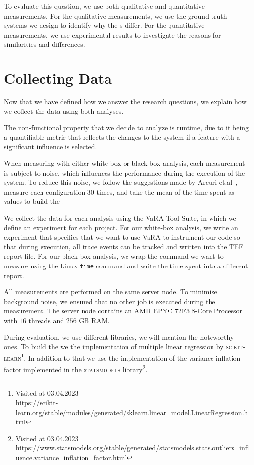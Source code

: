 To evaluate this question, we use both qualitative and quantitative measurements. 
For the qualitative measurements, we use the ground truth systems we design to identify why the {\perfInfluenceModel}s differ. 
For the quantitative measurements, we use experimental results to investigate the reasons for similarities and differences.

\section{Collecting Data}\label{ch:collect-data}
Now that we have defined how we answer the research questions, we explain how we collect the data using both analyses.

The non-functional property that we decide to analyze is runtime, due to it being a quantifiable metric
that reflects the changes to the system if a feature with a significant influence is selected.

When measuring with either white-box or black-box analysis, 
each measurement is subject to noise, which influences the performance during the execution of the system. 
To reduce this noise, we follow the suggestions made by Arcuri et.al~\cite{SampleSize}, 
measure each configuration 30 times, and take the mean of the time spent as values to build the {\perfInfluenceModel}.

We collect the data for each analysis using the VaRA Tool Suite, in which we define an experiment for each project. 
For our white-box analysis, we write an experiment that specifies that we want to use VaRA to instrument our code so that during execution, 
all trace events can be tracked and written into the TEF report file. For our black-box analysis, 
we wrap the command we want to measure using the Linux \texttt{time} command and write the time spent into a different report. 

All measurements are performed on the same server node. To minimize background noise, we ensured that no other job is executed during the measurement. 
The server node contains an AMD EPYC $72$F$3$  $8$-Core Processor with $16$ threads and $256$ GB RAM.

During evaluation, we use different libraries, we will mention the noteworthy ones.
To build the {\perfInfluenceModel} we the implementation of multiple linear regression by \textsc{scikit-learn}\footnote{Visited at 03.04.2023\\ \url{https://scikit-learn.org/stable/modules/generated/sklearn.linear_model.LinearRegression.html}}.
In addition to that we use the implementation of the variance inflation factor implemented in the \textsc{statsmodels} library\footnote{Visited at 03.04.2023\\ \url{https://www.statsmodels.org/stable/generated/statsmodels.stats.outliers_influence.variance_inflation_factor.html}}.

